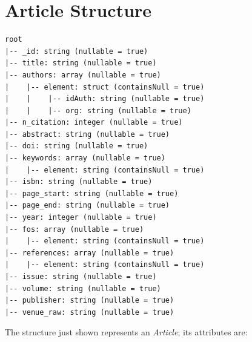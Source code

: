 \documentclass{Configuration_Files/PoliMi3i_thesis}
\begin{document}
\section{Article Structure}
\begin{lstlisting}
root
|-- _id: string (nullable = true)
|-- title: string (nullable = true)
|-- authors: array (nullable = true)
|    |-- element: struct (containsNull = true)
|    |    |-- idAuth: string (nullable = true)
|    |    |-- org: string (nullable = true)
|-- n_citation: integer (nullable = true)
|-- abstract: string (nullable = true)
|-- doi: string (nullable = true)
|-- keywords: array (nullable = true)
|    |-- element: string (containsNull = true)
|-- isbn: string (nullable = true)
|-- page_start: string (nullable = true)
|-- page_end: string (nullable = true)
|-- year: integer (nullable = true)
|-- fos: array (nullable = true)
|    |-- element: string (containsNull = true)
|-- references: array (nullable = true)
|    |-- element: string (containsNull = true)
|-- issue: string (nullable = true)
|-- volume: string (nullable = true)
|-- publisher: string (nullable = true)
|-- venue_raw: string (nullable = true)
\end{lstlisting}
The structure just shown represents an \emph{Article}; its attributes are:
\end{document}
